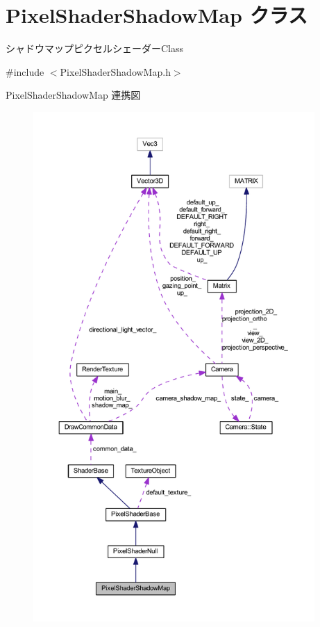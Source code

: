 \hypertarget{class_pixel_shader_shadow_map}{}\section{Pixel\+Shader\+Shadow\+Map クラス}
\label{class_pixel_shader_shadow_map}


シャドウマップピクセルシェーダー\+Class  




{\ttfamily \#include $<$Pixel\+Shader\+Shadow\+Map.\+h$>$}



Pixel\+Shader\+Shadow\+Map 連携図\nopagebreak
\begin{figure}[H]
\begin{center}
\leavevmode
\includegraphics[height=550pt]{class_pixel_shader_shadow_map__coll__graph}
\end{center}
\end{figure}
